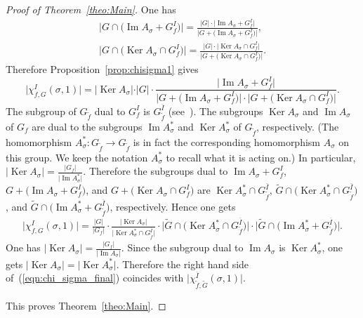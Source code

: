 \begin{proof}[Proof of Theorem~\ref{theo:Main}]
One has
\begin{gather*}
\big\vert G\cap\big(\operatorname{Im}A_{\sigma} + G_f^I\big)\big\vert =
\frac{\vert G\vert\cdot\big\vert\operatorname{Im}A_{\sigma} + G_f^I\big\vert}{\big\vert G+\big(\operatorname{Im}A_{\sigma} + G_f^I\big)\big\vert}, \\
\big\vert G\cap\big(\operatorname{Ker}A_{\sigma}\cap G_f^I\big)\big\vert =
\frac{\vert G\vert\cdot\big\vert\operatorname{Ker}A_{\sigma}\cap G_f^I\big\vert}{\big\vert G+\big(\operatorname{Ker}A_{\sigma}\cap G_f^I\big)\big\vert}.
\end{gather*}
Therefore Proposition~\ref{prop:chisigma1} gives
\[
 \big\vert \chi_{f,G}^I(\sigma,1)\big\vert=\vert\operatorname{Ker}A_{\sigma}\vert\cdot\vert G\vert\cdot
\frac{\big\vert\operatorname{Im}A_{\sigma}+ G_f^I\big\vert}
{\big\vert G+\big(\operatorname{Im}A_{\sigma}+ G_f^I\big)\big\vert\cdot\big\vert G+\big(\operatorname{Ker}A_{\sigma}\cap G_f^I\big)\big\vert}.
\]
The subgroup of $G_{\widetilde{f}}$ dual to $G_f^I$ is $G_{\widetilde{f}}^{\overline{I}}$
(see~\cite[Lemma~1]{EG-BLMS}).
The subgroups $\operatorname{Ker}A_{\sigma}$ and $\operatorname{Im}A_{\sigma}$ of $G_f$ are dual to the subgroups
$\operatorname{Im}A^*_{\sigma}$ and $\operatorname{Ker}A^*_{\sigma}$ of $G_{\widetilde{f}}$, respectively.
(The homomorphism $A^*_{\sigma}\colon G_{\widetilde{f}}\to G_{\widetilde{f}}$ is in fact the corresponding homomorphism
$A_{\sigma}$ on this group. We keep the notation $A^*_{\sigma}$ to recall what it is acting on.) In particular,
$\vert \operatorname{Ker}A_{\sigma}\vert=\frac{\vert G_f\vert}{\vert \operatorname{Im}A^*_{\sigma}\vert}$.
Therefore the subgroups dual to $\operatorname{Im}A_{\sigma}+ G_f^I$, $G+\big(\operatorname{Im}A_{\sigma}+ G_f^I\big)$, and
$G+\big(\operatorname{Ker}A_{\sigma}\cap G_f^I\big)$ are $\operatorname{Ker}A^*_{\sigma}\cap G_{\widetilde{f}}^{\overline{I}}$,
$\widetilde{G}\cap\big(\operatorname{Ker}A^*_{\sigma} \cap G_{\widetilde{f}}^{\overline{I}}\big)$, and
$\widetilde{G} \cap\big(\operatorname{Im}A^*_{\sigma} + G_{\widetilde{f}}^{\overline{I}}\big)$, respectively. Hence one gets
\begin{gather}\label{eqn:chi_sigma_final}
 \big\vert \chi_{f,G}^I(\sigma,1) \big\vert =
 \frac{\vert G \vert}{\vert G_f \vert} \cdot \frac{\vert\operatorname{Ker}
 A_{\sigma}\vert}{\big\vert\operatorname{Ker}A^*_{\sigma} \cap G_{\widetilde{f}}^{\overline{I}}\big\vert}\cdot
 \big\vert\widetilde{G}\cap\big(\operatorname{Ker}A^*_{\sigma} \cap G_{\widetilde{f}}^{\overline{I}}\big)\big\vert
 \cdot
 \big\vert\widetilde{G}\cap\big(\operatorname{Im}A^*_{\sigma}+ G_{\widetilde{f}}^{\overline{I}}\big)\big\vert.
\end{gather}
One has $\vert\operatorname{Ker}A_{\sigma}\vert=\frac{\vert G_f\vert}{\vert\operatorname{Im}A_{\sigma}\vert}$. Since the subgroup
dual to $\operatorname{Im}A_{\sigma}$ is $\operatorname{Ker}A^*_{\sigma}$, one gets
$\vert\operatorname{Ker}A_{\sigma}\vert=\vert\operatorname{Ker}A^*_{\sigma}\vert$. Therefore the right hand side of~(\ref{eqn:chi_sigma_final}) coincides with $\big\vert \chi_{\widetilde{f},\widetilde{G}}^{\overline{I}}(\sigma,1) \big\vert$.

This proves Theorem~\ref{theo:Main}.
\end{proof}
